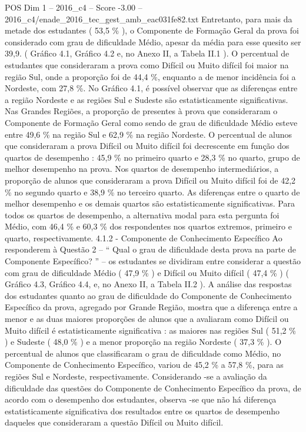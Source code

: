 \begin{textsample}{POS Dim 1 – 2016\_c4 – Score -3.00 – 2016\_c4/enade\_2016\_tec\_gest\_amb\_eac031fe82.txt}
Entretanto, para mais da metade dos estudantes ( 53,5 \% ), o Componente de Formação Geral da prova foi considerado com grau de dificuldade Médio, apesar da média para esse quesito ser 39,9. ( Gráfico 4.1, Gráfico 4.2 e, no Anexo II, a Tabela II.1 ).
O percentual de estudantes que consideraram a prova como Difícil ou Muito difícil foi maior na região Sul, onde a proporção foi de 44,4 \%, enquanto a de menor incidência foi a Nordeste, com 27,8 \%.
No Gráfico 4.1, é possível observar que as diferenças entre a região Nordeste e as regiões Sul e Sudeste são estatisticamente significativas.
Nas Grandes Regiões, a proporção de presentes à prova que consideraram o Componente de Formação Geral como sendo de grau de dificuldade Médio esteve entre 49,6 \% na região Sul e 62,9 \% na região Nordeste.
O percentual de alunos que consideraram a prova Difícil ou Muito difícil foi decrescente em função dos quartos de desempenho : 45,9 \% no primeiro quarto e 28,3 \% no quarto, grupo de melhor desempenho na prova.
Nos quartos de desempenho intermediários, a proporção de alunos que consideraram a prova Difícil ou Muito difícil foi de 42,2 \% no segundo quarto e 38,9 \% no terceiro quarto.
As diferenças entre o quarto de melhor desempenho e os demais quartos são estatisticamente significativas.
Para todos os quartos de desempenho, a alternativa modal para esta pergunta foi Médio, com 46,4 \% e 60,3 \% dos respondentes nos quartos extremos, primeiro e quarto, respectivamente. 4.1.2 - Componente de Conhecimento Específico Ao responderem à Questão 2 – “ Qual o grau de dificuldade desta prova na parte de Componente Específico? ” – os estudantes se dividiram entre considerar a questão com grau de dificuldade Médio ( 47,9 \% ) e Difícil ou Muito difícil ( 47,4 \% ) ( Gráfico 4.3, Gráfico 4.4, e, no Anexo II, a Tabela II.2 ).
A análise das respostas dos estudantes quanto ao grau de dificuldade do Componente de Conhecimento Específico da prova, agregado por Grande Região, mostra que a diferença entre a menor e as duas maiores proporções de alunos que a avaliaram como Difícil ou Muito difícil é estatisticamente significativa : as maiores nas regiões Sul ( 51,2 \% ) e Sudeste ( 48,0 \% ) e a menor proporção na região Nordeste ( 37,3 \% ).
O percentual de alunos que classificaram o grau de dificuldade como Médio, no Componente de Conhecimento Específico, variou de 45,2 \% a 57,8 \%, para as regiões Sul e Nordeste, respectivamente.
Considerando -se a avaliação da dificuldade das questões do Componente de Conhecimento Específico da prova, de acordo com o desempenho dos estudantes, observa -se que não há diferença estatisticamente significativa dos resultados entre os quartos de desempenho daqueles que consideraram a questão Difícil ou Muito difícil.

\end{textsample}
